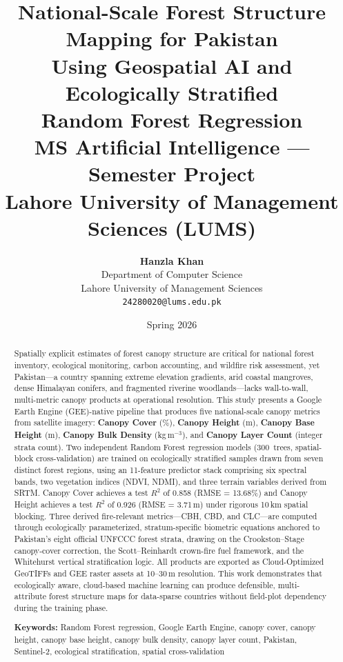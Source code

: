 \documentclass[12pt,a4paper,twoside]{article}
\title{%
  \textbf{National-Scale Forest Structure Mapping for Pakistan\\
  Using Geospatial AI and Ecologically Stratified\\
  Random Forest Regression}\\[0.8em]
  \large MS Artificial Intelligence --- Semester Project\\
  \large Lahore University of Management Sciences (LUMS)
}
\author{%
  \textbf{Hanzla Khan}\\
  Department of Computer Science\\
  Lahore University of Management Sciences\\
  \texttt{24280020@lums.edu.pk}
}
\date{Spring 2026}
\begin{document}
\maketitle
\thispagestyle{empty}

\begin{abstract}
\noindent
Spatially explicit estimates of forest canopy structure are critical for national forest
inventory, ecological monitoring, carbon accounting, and wildfire risk assessment, yet
Pakistan---a country spanning extreme elevation gradients, arid coastal mangroves,
dense Himalayan conifers, and fragmented riverine woodlands---lacks wall-to-wall,
multi-metric canopy products at operational resolution.  This study presents a
Google Earth Engine (GEE)-native pipeline that produces five national-scale canopy
metrics from satellite imagery: \textbf{Canopy Cover} (\%), \textbf{Canopy Height}
(m), \textbf{Canopy Base Height} (m), \textbf{Canopy Bulk Density}
(kg\,m$^{-3}$), and \textbf{Canopy Layer Count} (integer strata count).
Two independent Random Forest regression models (300~trees, spatial-block
cross-validation) are trained on ecologically stratified samples drawn from seven
distinct forest regions, using an 11-feature predictor stack comprising six spectral
bands, two vegetation indices (NDVI, NDMI), and three terrain variables derived from
SRTM.  Canopy Cover achieves a test $R^{2}$ of 0.858 (RMSE = 13.68\%) and Canopy
Height achieves a test $R^{2}$ of 0.926 (RMSE = 3.71\,m) under rigorous 10\,km
spatial blocking.  Three derived fire-relevant metrics---CBH, CBD, and CLC---are
computed through ecologically parameterized, stratum-specific biometric equations
anchored to Pakistan's eight official UNFCCC forest strata, drawing on the
Crookston--Stage canopy-cover correction, the Scott--Reinhardt crown-fire fuel
framework, and the Whitehurst vertical stratification logic.  All products are
exported as Cloud-Optimized GeoTIFFs and GEE raster assets at 10--30\,m resolution.
This work demonstrates that ecologically aware, cloud-based machine learning can
produce defensible, multi-attribute forest structure maps for data-sparse countries
without field-plot dependency during the training phase.

\medskip
\noindent\textbf{Keywords:} Random Forest regression, Google Earth Engine, canopy
cover, canopy height, canopy base height, canopy bulk density, canopy layer count,
Pakistan, Sentinel-2, ecological stratification, spatial cross-validation
\end{abstract}
\end{document}
